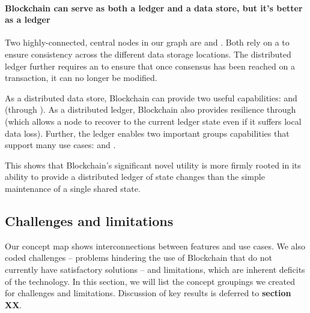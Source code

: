 {\paragraph{Blockchain can serve as both a ledger and a data store, but it's better as a ledger}
Two highly-connected, central nodes in our graph are  and . Both rely on a  to ensure consistency across the different data storage locations. The distributed ledger further requires an  to ensure that once consensus has been reached on a transaction, it can no longer be modified. 

As a distributed data store, Blockchain can provide two useful capabilities:  and  (through ). As a distributed ledger, Blockchain also provides resilience through  (which allows a node to recover to the current ledger state even if it suffers local data loss). Further, the ledger enables two important groups capabilities that support many use cases:  and . 

This shows that Blockchain's significant novel utility is more firmly rooted in its ability to provide a distributed ledger of state changes than the simple maintenance of a single shared state.

\subsection{Challenges and limitations}
\label{subsec:challenges}
Our concept map shows interconnections between features and use cases. We also coded challenges -- problems hindering the use of Blockchain that do not currently have satisfactory solutions -- and limitations, which are inherent deficits of the technology. In this section, we will list the concept groupings we created for challenges and limitations. Discussion of key results %
is deferred to \textbf{section XX}.

}
